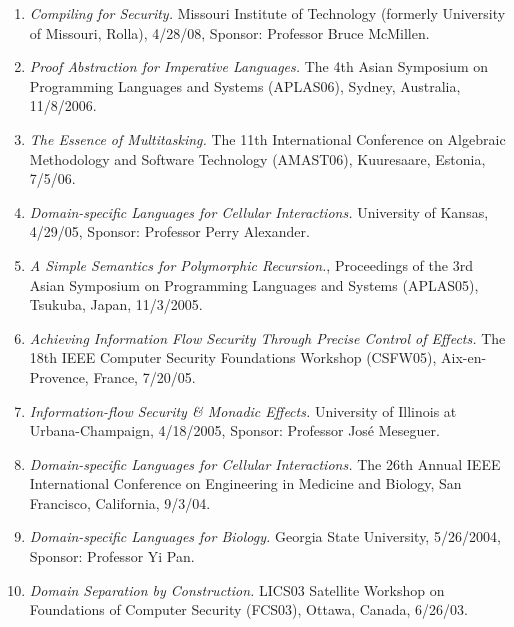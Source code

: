 \documentclass[12pt]{article} %
\begin{document}
\begin{enumerate}[leftmargin=0mm]
\item{\it Compiling for Security.} Missouri Institute of Technology (formerly University of Missouri, Rolla), 4/28/08, Sponsor: Professor Bruce McMillen.

\item{\it Proof Abstraction for Imperative Languages.} The 4th Asian Symposium on Programming Languages and Systems (APLAS06), Sydney, Australia, 11/8/2006. 

\item{\it The Essence of Multitasking.} The 11th International Conference on Algebraic Methodology and Software Technology (AMAST06), Kuuresaare, Estonia, 7/5/06.

\item{\it Domain-specific Languages for Cellular Interactions.} University of Kansas, 4/29/05, Sponsor: Professor Perry Alexander. 

\item{\it A Simple Semantics for Polymorphic Recursion.}, Proceedings of the 3rd Asian Symposium on Programming Languages and Systems (APLAS05), Tsukuba, Japan, 11/3/2005.

\item{\it Achieving Information Flow Security Through Precise Control of Effects.} The 18th IEEE Computer Security Foundations Workshop (CSFW05), Aix-en-Provence, France, 7/20/05.

\item{\it Information-flow Security \& Monadic Effects.}
University of Illinois at Urbana-Champaign, 4/18/2005, Sponsor:
Professor Jos\'{e} Meseguer.

\item{\it Domain-specific Languages for Cellular Interactions.} The 26th Annual IEEE International Conference on Engineering in Medicine and Biology, San Francisco, California, 9/3/04.

\item{\it Domain-specific Languages for Biology.} Georgia State
  University, 5/26/2004, Sponsor: Professor Yi Pan.




\item{\it Domain Separation by Construction.} LICS03 Satellite Workshop on Foundations of Computer Security (FCS03), Ottawa, Canada, 6/26/03. 


\end{enumerate}
\end{document}

